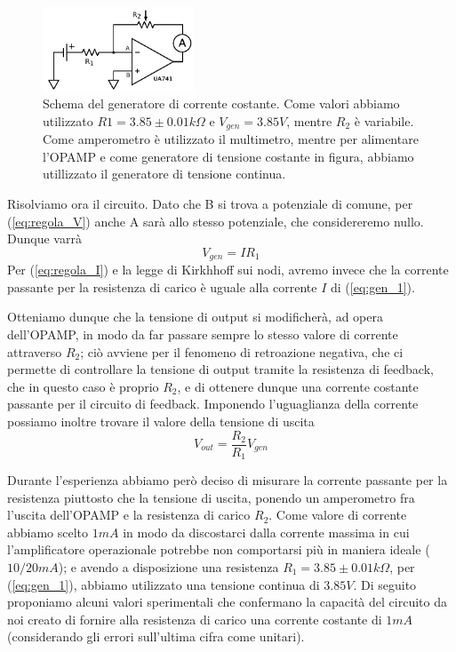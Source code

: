 \documentclass {article}
\begin{document}
\begin{figure}
  \begin{center}
    \includegraphics[width=0.40\textwidth]{c1.pdf}
  \end{center}
  \caption{Schema del generatore di corrente costante. Come valori abbiamo utilizzato $R1=3.85 \pm 0.01 k\Omega$ e $V_{gen}=3.85 V$, mentre $R_2$ è variabile. Come amperometro è utilizzato il multimetro, mentre per alimentare l'OPAMP e come generatore di tensione costante in figura, abbiamo utillizzato il generatore di tensione continua.}
\end{figure}

Risolviamo ora il circuito. Dato che B si trova a potenziale di comune, per (\ref{eq:regola_V}) anche A sarà allo stesso potenziale, che considereremo nullo. Dunque varrà
\begin{equation}
V_{gen}=I R_1
\label{eq:gen_1}
\end{equation}
Per (\ref{eq:regola_I}) e la legge di Kirkhhoff sui nodi, avremo invece che la corrente passante per la resistenza di carico è uguale alla corrente $I$ di (\ref{eq:gen_1}).

Otteniamo dunque che la tensione di output si modificherà, ad opera dell'OPAMP, in modo da far passare sempre lo stesso valore di corrente attraverso $R_2$; ciò avviene per il fenomeno di retroazione negativa, che ci permette di controllare la tensione di output tramite la resistenza di feedback, che in questo caso è proprio $R_2$, e di ottenere dunque una corrente costante passante per il circuito di feedback. Imponendo l'uguaglianza della corrente possiamo inoltre trovare il valore della tensione di uscita
$$V_{out}=\frac{R_2}{R_1} V_{gen}$$

Durante l'esperienza abbiamo però deciso di misurare la corrente passante per la resistenza piuttosto che la tensione di uscita, ponendo un amperometro fra l'uscita dell'OPAMP e la resistenza di carico $R_2$. Come valore di corrente abbiamo scelto $1 mA$ in modo da discostarci dalla corrente massima in cui l'amplificatore operazionale potrebbe non comportarsi più in maniera ideale ($10/20 mA$); e avendo a disposizione una resistenza $R_1=3.85 \pm 0.01 k\Omega$, per (\ref{eq:gen_1}), abbiamo utilizzato una tensione continua di $3.85 V$. Di seguito proponiamo alcuni valori sperimentali che confermano la capacità del circuito da noi creato di fornire alla resistenza di carico una corrente costante di $1 mA$ (considerando gli errori sull'ultima cifra come unitari).
\end{document}
